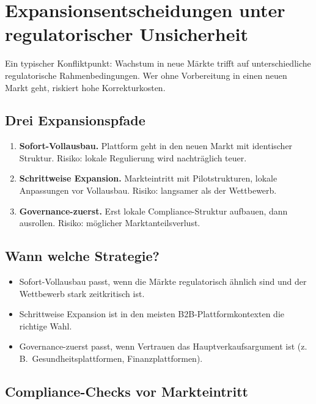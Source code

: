 \documentclass[11pt,a4paper,oneside]{article}
\begin{document}
\section{Expansionsentscheidungen unter regulatorischer Unsicherheit}

Ein typischer Konfliktpunkt: Wachstum in neue Märkte trifft auf unterschiedliche regulatorische Rahmenbedingungen. Wer ohne Vorbereitung in einen neuen Markt geht, riskiert hohe Korrekturkosten.

\subsection{Drei Expansionspfade}

\begin{enumerate}
  \item \textbf{Sofort-Vollausbau.} Plattform geht in den neuen Markt mit identischer Struktur. Risiko: lokale Regulierung wird nachträglich teuer.
  \item \textbf{Schrittweise Expansion.} Markteintritt mit Pilotstrukturen, lokale Anpassungen vor Vollausbau. Risiko: langsamer als der Wettbewerb.
  \item \textbf{Governance-zuerst.} Erst lokale Compliance-Struktur aufbauen, dann ausrollen. Risiko: möglicher Marktanteilsverlust.
\end{enumerate}

\subsection{Wann welche Strategie?}

\begin{itemize}
  \item Sofort-Vollausbau passt, wenn die Märkte regulatorisch ähnlich sind und der Wettbewerb stark zeitkritisch ist.
  \item Schrittweise Expansion ist in den meisten B2B-Plattformkontexten die richtige Wahl.
  \item Governance-zuerst passt, wenn Vertrauen das Hauptverkaufsargument ist (z.\,B.\ Gesundheitsplattformen, Finanzplattformen).
\end{itemize}

\subsection{Compliance-Checks vor Markteintritt}
\end{document}
